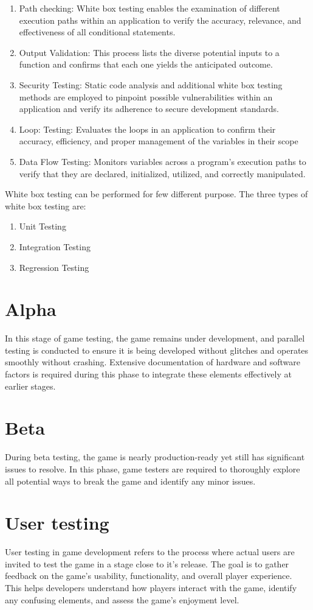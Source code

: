 \documentclass{article}
\begin{document}
\begin{enumerate}
	\item Path checking: White box testing enables the examination of different execution paths within an application to verify the accuracy, relevance, and effectiveness of all conditional statements.
	\item Output Validation: This process lists the diverse potential inputs to a function and confirms that each one yields the anticipated outcome.
	\item Security Testing: Static code analysis and additional white box testing methods are employed to pinpoint possible vulnerabilities within an application and verify its adherence to secure development standards.
	\item Loop: Testing: Evaluates the loops in an application to confirm their accuracy, efficiency, and proper management of the variables in their scope 
	\item Data Flow Testing: Monitors variables across a program's execution paths to verify that they are declared, initialized, utilized, and correctly manipulated.
\end{enumerate}

White box testing can be performed for few different purpose. The three types of white box testing are:
\begin{enumerate}
	\item Unit Testing
	\item Integration Testing
	\item Regression Testing
\end{enumerate}

\section{Alpha}
In this stage of game testing, the game remains under development, and parallel testing is conducted to ensure it is being developed without glitches and operates smoothly without crashing. Extensive documentation of hardware and software factors is required during this phase to integrate these elements effectively at earlier stages.

\section{Beta}
During beta testing, the game is nearly production-ready yet still has significant issues to resolve. In this phase, game testers are required to thoroughly explore all potential ways to break the game and identify any minor issues.

\section{User testing}
User testing in game development refers to the process where actual users are invited to test the game in a stage close to it's release. The goal is to gather feedback on  the game's usability, functionality, and overall player experience. This helps developers understand how players interact with the game, identify any confusing elements, and assess the game's enjoyment level.
\end{document}
